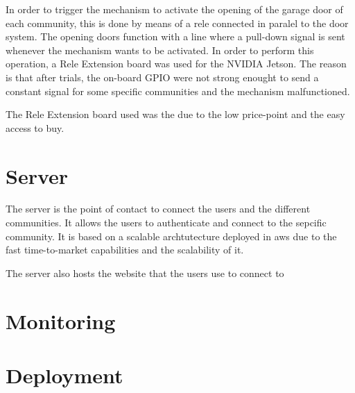 In order to trigger the mechanism to activate the opening of the garage door of each community, this is done by means of a rele connected in paralel to the door system. The opening doors function with a line where a pull-down signal is sent whenever the mechanism wants to be activated. In order to perform this operation, a Rele Extension board was used for the NVIDIA Jetson. The reason is that after trials, the on-board GPIO were not strong enought to send a constant signal for some specific communities and the mechanism malfunctioned.

The Rele Extension board used was the  due to the low price-point and the easy access to buy.

\section{Server}

The server is the point of contact to connect the users and the different communities. It allows the users to authenticate and connect to the sepcific community. It is based on a scalable archtutecture deployed in \gls{aws} due to the fast time-to-market capabilities and the scalability of it.

The server also hosts the website that the users use to connect to

\section{Monitoring}


\section{Deployment}


